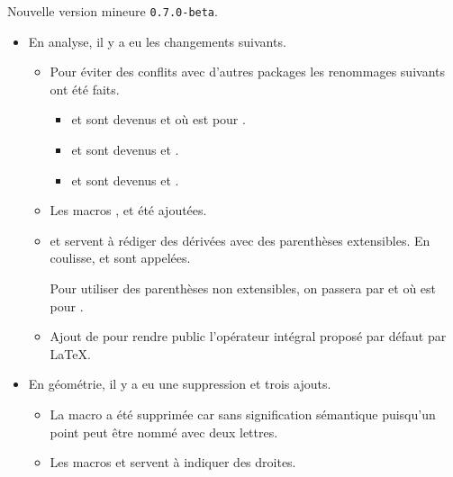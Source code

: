 Nouvelle version mineure \verb+0.7.0-beta+.

\begin{itemize}[itemsep=.5em]
    \item En analyse, il y a eu les changements suivants.
    \begin{itemize}[itemsep=.5em]
        \item Pour éviter des conflits avec d'autres packages les renommages suivants ont été faits.
        \begin{itemize}[itemsep=.5em]
            \item {} et  sont devenus  et  où  est pour .

            \item {} et  sont devenus  et .

            \item {} et  sont devenus  et .
        \end{itemize}

		\item Les macros ,  et  été ajoutées.

 		\item {} et  servent à rédiger des dérivées avec des parenthèses extensibles. En coulisse,  et  sont appelées.

        Pour utiliser des parenthèses non extensibles, on passera par  et  où  est pour .

		\item Ajout de  pour rendre public l'opérateur intégral proposé par défaut par \LaTeX.
    \end{itemize}


    \item En géométrie, il y a eu une suppression et trois ajouts.
    \begin{itemize}[itemsep=.5em]
        \item La macro  a été supprimée car sans signification sémantique puisqu'un point peut être nommé avec deux lettres.

        \item Les macros  et  servent à indiquer des droites.


\end{itemize}
\end{itemize}
